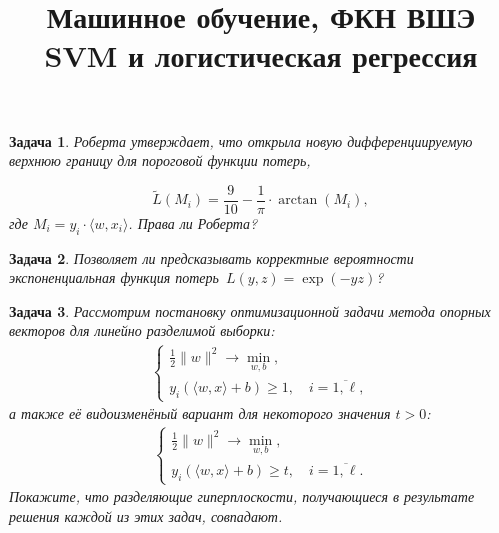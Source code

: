 \documentclass[12pt,fleqn]{article}
\title{Машинное обучение, ФКН ВШЭ\\ SVM и логистическая регрессия}
\author{}
\date{}
\newtheorem{esProblem}{Задача}
\begin{document}
\maketitle

\begin{esProblem}
    Роберта утверждает, что открыла новую дифференциируемую верхнюю границу для пороговой функции потерь,
    
    \[\tilde{L}(M_i) = \frac{9}{10} - \frac{1}{\pi} \cdot \arctan(M_i),\]
    где $M_i = y_i \cdot \langle w, x_i \rangle$. Права ли Роберта?
\end{esProblem}

\begin{esProblem}
    Позволяет ли предсказывать корректные вероятности экспоненциальная функция потерь~$L(y, z) = \exp(-yz)$?
\end{esProblem}

\begin{esProblem}
    Рассмотрим постановку оптимизационной задачи метода опорных векторов для линейно разделимой выборки:
    \begin{align*}
        \begin{cases}
            \frac{1}{2} \| w\|^2 \to \min_{w, b},\\
            y_i (\langle w, x\rangle + b) \ge 1, \quad i = \overline{1, \ell},
        \end{cases}
    \end{align*}
    а также её видоизменёный вариант для некоторого значения $t > 0$:
\begin{align*}
        \begin{cases}
            \frac{1}{2} \| w\|^2 \to \min_{w, b},\\
            y_i (\langle w, x\rangle + b) \ge t, \quad i = \overline{1, \ell}.
        \end{cases}
    \end{align*}
     Покажите, что разделяющие гиперплоскости, получающиеся в результате решения каждой из этих задач, совпадают.
\end{esProblem}


\end{document}
